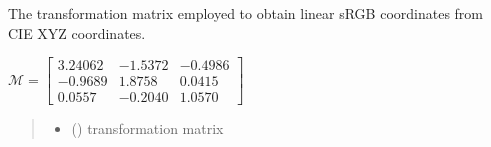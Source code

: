 \documentclass[letterpaper,10pt,english]{sphinxmanual}
\begin{document}
\begin{fulllineitems}
\label{\detokenize{07_colors:skinoptics.colors.transf_matrix_sRGB_linear_from_XYZ}}
\pysigstartsignatures
{}
\pysigstopsignatures
\sphinxAtStartPar
The transformation matrix employed to obtain linear sRGB coordinates from CIE XYZ coordinates.

\sphinxAtStartPar
\(\mathcal{M} = 
\begin{bmatrix}
3.24062 & -1.5372 & -0.4986 \\
-0.9689 & 1.8758 & 0.0415 \\
0.0557 & -0.2040 & 1.0570
\end{bmatrix}\)
\begin{quote}\begin{description}
\sphinxAtStartPar
\begin{itemize}
\item {} 
\sphinxAtStartPar
{} () \textendash{} transformation matrix

\end{itemize}


\end{description}\end{quote}

\end{fulllineitems}

\end{document}
